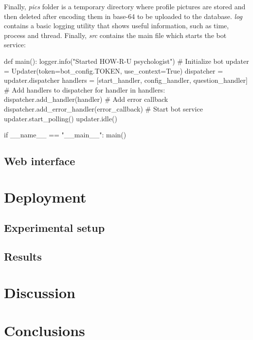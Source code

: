 \documentclass[12pt,english]{article}
\begin{document}
Finally, \emph{pics} folder is a temporary directory where profile pictures are stored and then deleted after encoding them in base-64 to be uploaded to the database. \emph{log} contains a basic logging utility that shows useful information, such as time, process and thread. Finally, \emph{src} contains the main file which starts the bot service:

\begin{python}[caption={Bot file, the one that starts the service}, captionpos=b]
def main():
    logger.info("Started HOW-R-U psychologist")
    # Initialize bot
    updater = Updater(token=bot_config.TOKEN, use_context=True)
    dispatcher = updater.dispatcher
    handlers = [start_handler, config_handler, question_handler]
    # Add handlers to dispatcher
    for handler in handlers:
        dispatcher.add_handler(handler)
    # Add error callback
    dispatcher.add_error_handler(error_callback)
    # Start bot service
    updater.start_polling()
    updater.idle()

if __name__ == "__main__":
    main()
\end{python}

\subsection{Web interface}


\section{Deployment}
\label{sec:deployment}


\subsection{Experimental setup}

\subsection{Results}


\section{Discussion}

\section{Conclusions}

\newpage


\doclicenseThis
\end{document}

